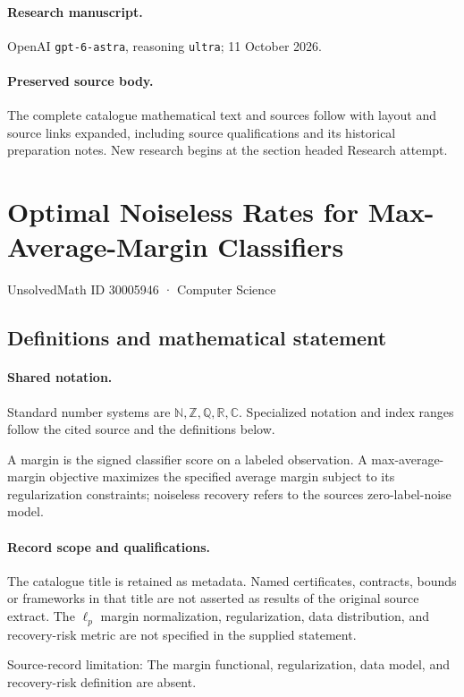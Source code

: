 \documentclass[11pt]{article}
\begin{document}
\paragraph{Research manuscript.} OpenAI \texttt{gpt-6-astra}, reasoning \texttt{ultra}; 11 October 2026.
\paragraph{Preserved source body.} The complete catalogue mathematical text and sources follow with layout and source links expanded, including source qualifications and its historical preparation notes. New research begins at the section headed Research attempt.

\section{Optimal Noiseless Rates for Max-Average-Margin Classifiers}\label{30005946}
{\small UnsolvedMath ID 30005946 · Computer Science}
\subsection{Definitions and mathematical statement}

\paragraph{Shared notation.}Standard number systems are $\mathbb N,\mathbb Z,\mathbb Q,\mathbb R,\mathbb C$. Specialized notation and index ranges follow the cited source and the definitions below.


A margin is the signed classifier score on a labeled observation. A max-average-margin objective maximizes the specified average margin subject to its regularization constraints; noiseless recovery refers to the source\textquotesingle s zero-label-noise model.
\paragraph{Record scope and qualifications.}
The catalogue title is retained as metadata. Named certificates, contracts, bounds or frameworks in that title are not asserted as results of the original source extract.
The $\ell_p$ margin normalization, regularization, data distribution, and recovery-risk metric are not specified in the supplied statement.

Source-record limitation: The margin functional, regularization, data model, and recovery-risk definition are absent.
\end{document}

